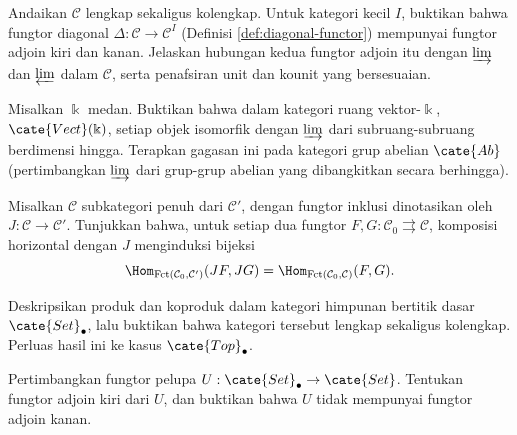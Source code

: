 \begin{Exercises}
\begin{inparaenum}[(i)]
		\end{inparaenum}

	\item Andaikan $\mathcal{C}$ lengkap sekaligus kolengkap. Untuk kategori kecil $I$, buktikan bahwa fungtor diagonal $\Delta: \mathcal{C} \to \mathcal{C}^I$ (Definisi \ref{def:diagonal-functor}) mempunyai fungtor adjoin kiri dan kanan. Jelaskan hubungan kedua fungtor adjoin itu dengan $\varinjlim$ dan $\varprojlim$ dalam $\mathcal{C}$, serta penafsiran unit dan kounit yang bersesuaian.
	\item Misalkan $\Bbbk$ medan. Buktikan bahwa dalam kategori ruang vektor-$\Bbbk$, $\cate{Vect}(\Bbbk)$, setiap objek isomorfik dengan $\varinjlim$ dari subruang-subruang berdimensi hingga. Terapkan gagasan ini pada kategori grup abelian $\cate{Ab}$ (pertimbangkan $\varinjlim$ dari grup-grup abelian yang dibangkitkan secara berhingga).
	\item Misalkan $\mathcal{C}$ subkategori penuh dari $\mathcal{C}'$, dengan fungtor inklusi dinotasikan oleh $J: \mathcal{C} \to \mathcal{C}'$. Tunjukkan bahwa, untuk setiap dua fungtor $F, G: \mathcal{C}_0 \rightrightarrows \mathcal{C}$, komposisi horizontal dengan $J$ menginduksi bijeksi
		\[ \Hom_{\text{Fct}(\mathcal{C}_0, \mathcal{C}')}(JF, JG) = \Hom_{\text{Fct}(\mathcal{C}_0, \mathcal{C})}(F, G). \]
	\item Deskripsikan produk dan koproduk dalam kategori himpunan bertitik dasar $\cate{Set}_\bullet$, lalu buktikan bahwa kategori tersebut lengkap sekaligus kolengkap. Perluas hasil ini ke kasus $\cate{Top}_\bullet$.
	\item Pertimbangkan fungtor pelupa $U: \cate{Set}_\bullet \to \cate{Set}$. Tentukan fungtor adjoin kiri dari $U$, dan buktikan bahwa $U$ tidak mempunyai fungtor adjoin kanan.
\end{Exercises}
